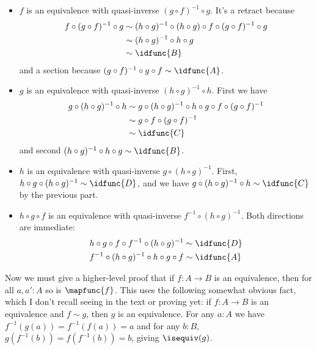 \begin{itemize}
\item  $f$ is an equivalence with quasi-inverse $(g \circ f)^{-1} \circ g$.  It's a
   retract because
   \begin{align*}
     f \circ (g \circ f)^{-1} \circ g
     &\sim
     (h \circ g)^{-1} \circ (h \circ g) \circ f \circ (g \circ f)^{-1} \circ g
     \\&\sim
     (h \circ g)^{-1} \circ h \circ g
     \\&\sim
     \idfunc{B}
   \end{align*}
   and a section because $(g \circ f)^{-1} \circ g \circ f \sim \idfunc{A}$.



\item  $g$ is an equivalence with quasi-inverse $(h \circ g)^{-1} \circ h$.  First
   we have
   \begin{align*}
     g \circ (h \circ g)^{-1} \circ h
     &\sim
     g \circ (h \circ g)^{-1} \circ h \circ g \circ f \circ (g \circ f)^{-1}
     \\&\sim
     g \circ f \circ (g \circ f)^{-1}
     \\&\sim
     \idfunc{C}
   \end{align*}
   and second $(h \circ g)^{-1} \circ h \circ g \sim \idfunc{B}$.



\item  $h$ is an equivalence with quasi-inverse $g \circ (h \circ g)^{-1}$.  First,
   $h \circ g \circ (h \circ g)^{-1} \sim \idfunc{D}$, and we have
   $g \circ (h \circ g)^{-1} \circ h \sim \idfunc{C}$ by the previous part.



\item  $h \circ g \circ f$ is an equivalence with quasi-inverse $f^{-1} \circ (h
   \circ g)^{-1}$.  Both directions are immediate:
   \begin{align*}
     h \circ g \circ f \circ f^{-1} \circ (h \circ g)^{-1} &\sim \idfunc{D} \\
     f^{-1} \circ (h \circ g)^{-1} \circ h \circ g \circ f &\sim \idfunc{A}
   \end{align*}

\end{itemize}




Now we must give a higher-level proof that if $f : A \to B$ is an equivalence,
then for all $a, a' : A$ so is $\mapfunc{f}$.  This uses the following
somewhat obvious fact, which I don't recall seeing in the text or proving yet:
if $f : A \to B$ is an equivalence and $f \sim g$, then $g$ is an equivalence.
For any $a : A$ we have $f^{-1}(g(a)) = f^{-1}(f(a)) = a$
and for any $b : B$, $g(f^{-1}(b)) = f(f^{-1}(b)) = b$, giving $\isequiv(g)$.


